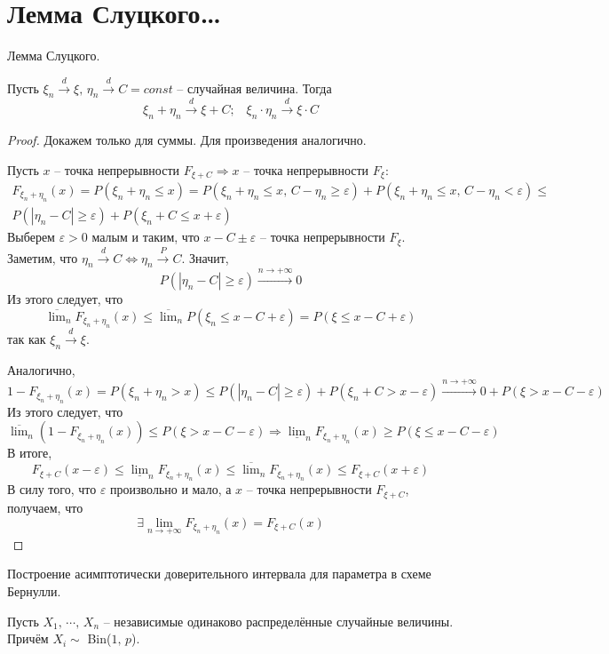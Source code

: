 \section{Лемма Слуцкого\dots}
\begin{theorem}
	Лемма Слуцкого.

	Пусть $\xi_n \stackrel{d}{\to} \xi,\, \eta_n \stackrel{d}{\to} C = const$ -- случайная величина. Тогда
	\[\xi_n + \eta_n \stackrel{d}{\to} \xi + C;\;\;\; \xi_n\cdot\eta_n \stackrel{d}{\to} \xi\cdot C\]
\end{theorem}

\begin{proof}
	Докажем только для суммы. Для произведения аналогично.

	Пусть $x$ -- точка непрерывности $F_{\xi + C} \Rightarrow x$ -- точка непрерывности $F_\xi$:
	\begin{align*}
		F_{\xi_n + \eta_n}(x) = P(\xi_n + \eta_n \leq x) = P(\xi_n + \eta_n \leq x,\, C - \eta_n \geq \varepsilon) + P(\xi_n + \eta_n \leq x,\, C - \eta_n < \varepsilon) \leq \\
		P(|\eta_n - C| \geq \varepsilon) + P(\xi_n + C \leq x + \varepsilon)
	\end{align*}
	Выберем $\varepsilon > 0$ малым и таким, что $x - C \pm \varepsilon$ -- точка непрерывности $F_\xi$. Заметим, что $\eta_n \stackrel{d}{\to} C \Leftrightarrow \eta_n \stackrel{P}{\to} C$. Значит,
	\[P(|\eta_n - C| \geq \varepsilon) \stackrel{n \to +\infty}{\to} 0\]
	Из этого следует, что
	\[\overline{\lim}_n F_{\xi_n + \eta_n}(x) \leq \overline{\lim}_n P(\xi_n \leq x - C + \varepsilon) = P(\xi \leq x - C + \varepsilon)\]
	так как $\xi_n \stackrel{d}{\to} \xi$.

	Аналогично,
	\[1 - F_{\xi_n + \eta_n}(x) = P(\xi_n + \eta_n > x) \leq P(|\eta_n - C| \geq \varepsilon) + P(\xi_n + C > x - \varepsilon) \stackrel{n \to +\infty}{\to} 0 + P(\xi > x - C - \varepsilon)\]
	Из этого следует, что
	\[\overline{\lim}_n(1 - F_{\xi_n + \eta_n}(x)) \leq P(\xi > x - C - \varepsilon) \Rightarrow \underline{\lim}_n F_{\xi_n + \eta_n}(x) \geq P(\xi \leq x - C - \varepsilon)\]
	В итоге,
	\[F_{\xi + C}(x - \varepsilon) \leq \underline{\lim}_nF_{\xi_n + \eta_n}(x) \leq \overline{\lim}_n F_{\xi_n + \eta_n}(x) \leq F_{\xi + C}(x + \varepsilon)\]
	В силу того, что $\varepsilon$ произвольно и мало, а $x$ -- точка непрерывности $F_{\xi + C}$, получаем, что
	\[\exists \lim_{n \to +\infty}F_{\xi_n + \eta_n}(x) = F_{\xi + C}(x)\]
\end{proof}

\begin{example}
  Построение асимптотически доверительного интервала для параметра в схеме Бернулли.

  Пусть $X_1,\,\cdots,\,X_n$ -- независимые одинаково распределённые случайные величины. Причём $X_i \sim$ Bin($1,\,p$).
\end{example}

